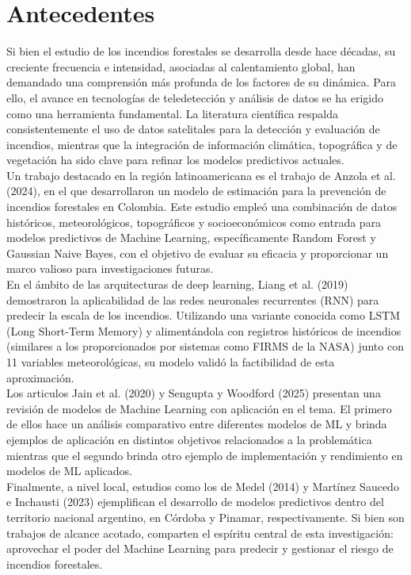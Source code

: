 \section{Antecedentes}
Si bien el estudio de los incendios forestales se desarrolla desde hace décadas, su creciente frecuencia e intensidad, asociadas al calentamiento global, han demandado una comprensión más profunda de los factores de su dinámica. Para ello, el avance en tecnologías de teledetección y análisis de datos se ha erigido como una herramienta fundamental. La literatura científica respalda consistentemente el uso de datos satelitales para la detección y evaluación de incendios, mientras que la integración de información climática, topográfica y de vegetación ha sido clave para refinar los modelos predictivos actuales. \\

Un trabajo destacado en la región latinoamericana es el trabajo de Anzola et al. (2024), en el que desarrollaron un modelo de estimación para la prevención de incendios forestales en Colombia. Este estudio empleó una combinación de datos históricos, meteorológicos, topográficos y socioeconómicos como entrada para modelos predictivos de Machine Learning, específicamente Random Forest y Gaussian Naive Bayes, con el objetivo de evaluar su eficacia y proporcionar un marco valioso para investigaciones futuras. \\

En el ámbito de las arquitecturas de deep learning, Liang et al. (2019) demostraron la aplicabilidad de las redes neuronales recurrentes (RNN) para predecir la escala de los incendios. Utilizando una variante conocida como LSTM (Long Short-Term Memory) y alimentándola con registros históricos de incendios (similares a los proporcionados por sistemas como FIRMS de la NASA) junto con 11 variables meteorológicas, su modelo validó la factibilidad de esta aproximación. \\

Los articulos Jain et al. (2020) y Sengupta y Woodford (2025) presentan una revisión de modelos de Machine Learning con aplicación en el tema. El primero de ellos hace un análisis comparativo entre diferentes modelos de ML y brinda ejemplos de aplicación en distintos objetivos relacionados a la problemática mientras que el segundo brinda otro ejemplo de implementación y rendimiento en modelos de ML aplicados.\\

Finalmente, a nivel local, estudios como los de Medel (2014) y Martínez Saucedo e Inchausti (2023) ejemplifican el desarrollo de modelos predictivos dentro del territorio nacional argentino, en Córdoba y Pinamar, respectivamente. Si bien son trabajos de alcance acotado, comparten el espíritu central de esta investigación: aprovechar el poder del Machine Learning para predecir y gestionar el riesgo de incendios forestales.